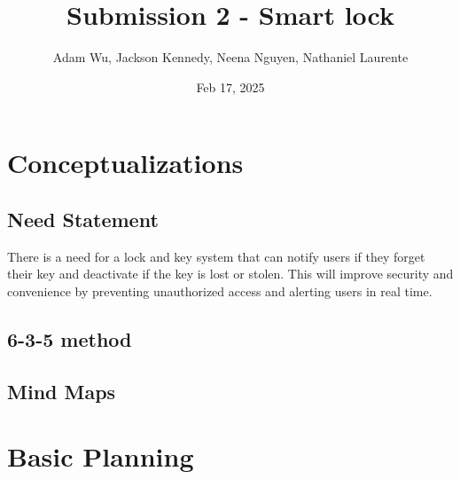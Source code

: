 \documentclass{article}
\title{Submission 2 - Smart lock} %
\author{Adam Wu, Jackson Kennedy, Neena Nguyen, Nathaniel Laurente}
\date{Feb 17, 2025}
\begin{document}
\maketitle

\tableofcontents
\newpage

\section{Conceptualizations}
\subsection{Need Statement}
There is a need for a lock and key system that can notify users if they forget their key and deactivate if the key is lost or stolen. This will improve security and convenience by preventing unauthorized access and alerting users in real time.


\subsection{6-3-5 method}



\subsection{Mind Maps}



\newpage
\section{Basic Planning}


\end{document}
